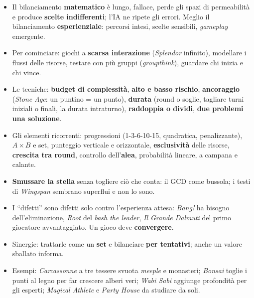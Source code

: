 \begin{itemize}
  \item Il bilanciamento \textbf{matematico} è lungo, fallace, perde gli spazi di
        permeabilità e produce \textbf{scelte indifferenti}; l'IA ne ripete gli errori. Meglio
        il bilanciamento \textbf{esperienziale}: percorsi intesi, scelte sensibili,
        \emph{gameplay} emergente.
  \item Per cominciare: giochi a \textbf{scarsa interazione} (\emph{Splendor} infinito),
        modellare i flussi delle risorse, testare con più gruppi (\emph{groupthink}),
        guardare chi inizia e chi vince.
  \item Le tecniche: \textbf{budget di complessità}, \textbf{alto e basso rischio},
        \textbf{ancoraggio} (\emph{Stone Age}: un puntino = un punto), \textbf{durata}
        (round o soglie, tagliare turni iniziali o finali, la durata intraturno),
        \textbf{raddoppia o dividi}, \textbf{due problemi una soluzione}.
  \item Gli elementi ricorrenti: progressioni (1-3-6-10-15, quadratica, penalizzante),
        $A \times B$ e set, punteggio verticale e orizzontale, \textbf{esclusività} delle
        risorse, \textbf{crescita tra round}, controllo dell'\textbf{alea}, probabilità
        lineare, a campana e calante.
  \item \textbf{Smussare la stella} senza togliere ciò che conta: il GCD come bussola; i testi
        di \emph{Wingspan} sembrano superflui e non lo sono.
  \item I ``difetti'' sono difetti solo contro l'esperienza attesa: \emph{Bang!} ha bisogno
        dell'eliminazione, \emph{Root} del \emph{bash the leader}, \emph{Il Grande Dalmuti} del
        primo giocatore avvantaggiato. Un gioco deve \textbf{convergere}.
  \item Sinergie: trattarle come un \textbf{set} e bilanciare \textbf{per tentativi}; anche un
        valore sballato informa.
  \item Esempi: \emph{Carcassonne} a tre tessere svuota \emph{meeple} e monasteri;
        \emph{Bonsai} toglie i punti al legno per far crescere alberi veri; \emph{Wabi Sabi}
        aggiunge profondità per gli esperti; \emph{Magical Athlete} e \emph{Party House} da
        studiare da soli.
\end{itemize}
